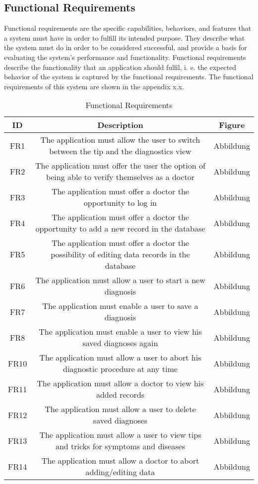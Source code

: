\subsection{Functional Requirements}
Functional requirements are the specific capabilities, behaviors, and features that a system must have in order to fulfill its intended purpose. They describe what the system must do in order to be considered successful, and provide a basis for evaluating the system's performance and functionality. Functional requirements describe the functionality that an application should fulfil, i. e. the expected behavior of the system is captured by the functional requirements. The functional requirements of this system are shown in the appendix x.x. 
\begin{table}[H]
	\begin{center}
		\scriptsize
		\def\arraystretch{2}%
		\begin{tabularx}{\textwidth}{ c|c|c}
			\hline
			ID & Description & Figure \\
			\hline
			FR1 & The application must allow the user to switch between the tip and the diagnostics view & Abbildung \\
			\hline
			FR2 & The application must offer the user the option of being able to verify themselves as a doctor & Abbildung \\
			\hline
			FR3 & The application must offer a doctor the opportunity to log in & Abbildung \\
			\hline
			FR4 & The application must offer a doctor the opportunity to add a new record in the database & Abbildung \\
			\hline
			FR5 & The application must offer a doctor the possibility of editing data records in the database & Abbildung \\
			\hline
			FR6 & The application must allow a user to start a new diagnosis & Abbildung \\
			\hline
			FR7 & The application must enable a user to save a diagnosis & Abbildung \\
			\hline	
			FR8 &The application must enable a user to view his saved diagnoses again & Abbildung \\
			\hline
			FR10 &The application must allow a user to abort his diagnostic procedure at any time & Abbildung \\
			\hline
			FR11 & The application must allow a doctor to view his added records & Abbildung \\
			\hline
			FR12 & The application must allow a user to delete saved diagnoses & Abbildung \\
			\hline
			FR13 & The application must allow a user to view tips and tricks for symptoms and diseases & Abbildung \\
			\hline
			FR14 & The application must allow a doctor to abort adding/editing data & Abbildung\\
			\hline
		\end{tabularx}
		\normalsize
	\end{center}
	\caption{Functional Requirements}
\end{table}


